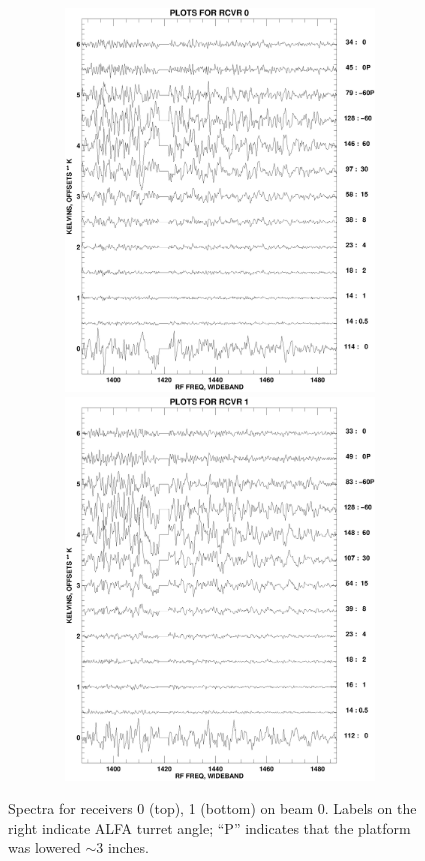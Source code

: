\documentclass[psfig,preprint]{aastex}
\begin{document}
\begin{figure}[!p]
\begin{center}
\includegraphics[width=6in, height=4in]{rcvrplot0.ps}   
\includegraphics[width=6in, height=4in]{rcvrplot1.ps}   
\end{center}
\caption{Spectra for receivers 0 (top), 1 (bottom) on beam 0. Labels on the right
indicate ALFA turret angle; ``P'' indicates that the platform was
lowered $\sim 3$ inches. \label{rcvr01}}
\end{figure}
\end{document}
